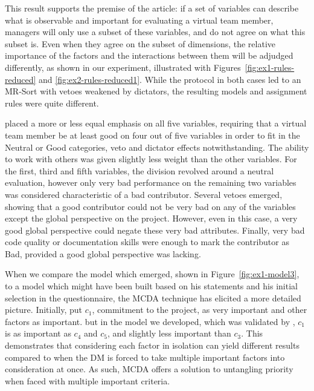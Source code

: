 This result supports the premise of the article: if a set of variables can describe what is observable and important for evaluating a virtual team member, managers will only use a subset of these variables, and do not agree on what this subset is. Even when they agree on the subset of dimensions, the relative importance of the factors and the interactions between them will be adjudged differently, as shown in our experiment, illustrated with Figures~\ref{fig:ex1-rules-reduced} and \ref{fig:ex2-rules-reduced1}. While the protocol in both cases led to an MR-Sort with vetoes weakened by dictators, the resulting models and assignment rules were quite different.

\GJ placed a more or less equal emphasis on all five variables, requiring that a virtual team member be at least good on four out of five variables in order to fit in the Neutral or Good categories, veto and dictator effects notwithstanding. The ability to work with others was given slightly less weight than the other variables. For the first, third and fifth variables, the division revolved around a neutral evaluation, however only very bad performance on the remaining two variables was considered characteristic of a bad contributor. Several vetoes emerged, showing that a good contributor could not be very bad on any of the variables except the  global perspective on the project. However, even in this case, a very good global perspective could negate these very bad attributes. Finally, very bad code quality or documentation skills were enough to mark the contributor as Bad, provided a good global perspective was lacking.

When we compare the model which emerged, shown in Figure~\ref{fig:ex1-model3}, to a model which might have been built based on his statements and his initial selection in the questionnaire, the MCDA technique has elicited a more detailed picture. Initially, \GJ put $c_1$, commitment to the project, as very important and other factors as important. but in the model we developed, which was validated by \GJ, $c_1$ is as important as $c_4$ and $c_5$, and slightly less important than $c_3$. This demonstrates that considering each factor in isolation can yield different results compared to when the DM is forced to take multiple important factors into consideration at once. As such, MCDA offers a solution to untangling priority when faced with multiple important criteria.

